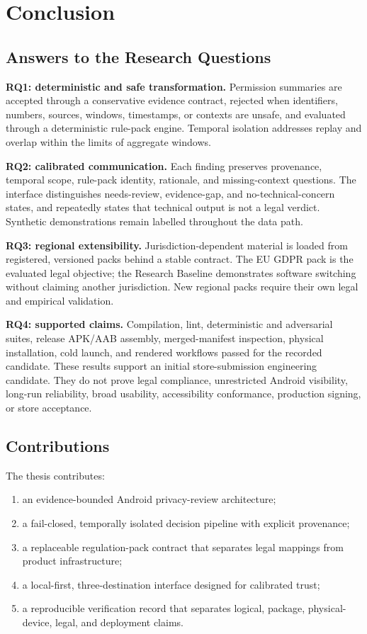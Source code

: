 \section{Conclusion}

\subsection{Answers to the Research Questions}

\textbf{RQ1: deterministic and safe transformation.} Permission summaries are accepted through a conservative evidence contract, rejected when identifiers, numbers, sources, windows, timestamps, or contexts are unsafe, and evaluated through a deterministic rule-pack engine. Temporal isolation addresses replay and overlap within the limits of aggregate windows.

\textbf{RQ2: calibrated communication.} Each finding preserves provenance, temporal scope, rule-pack identity, rationale, and missing-context questions. The interface distinguishes needs-review, evidence-gap, and no-technical-concern states, and repeatedly states that technical output is not a legal verdict. Synthetic demonstrations remain labelled throughout the data path.

\textbf{RQ3: regional extensibility.} Jurisdiction-dependent material is loaded from registered, versioned packs behind a stable contract. The EU GDPR pack is the evaluated legal objective; the Research Baseline demonstrates software switching without claiming another jurisdiction. New regional packs require their own legal and empirical validation.

\textbf{RQ4: supported claims.} Compilation, lint, deterministic and adversarial suites, release APK/AAB assembly, merged-manifest inspection, physical installation, cold launch, and rendered workflows passed for the recorded candidate. These results support an initial store-submission engineering candidate. They do not prove legal compliance, unrestricted Android visibility, long-run reliability, broad usability, accessibility conformance, production signing, or store acceptance.

\subsection{Contributions}

The thesis contributes:

\begin{enumerate}
    \item an evidence-bounded Android privacy-review architecture;
    \item a fail-closed, temporally isolated decision pipeline with explicit provenance;
    \item a replaceable regulation-pack contract that separates legal mappings from product infrastructure;
    \item a local-first, three-destination interface designed for calibrated trust;
    \item a reproducible verification record that separates logical, package, physical-device, legal, and deployment claims.
\end{enumerate}


